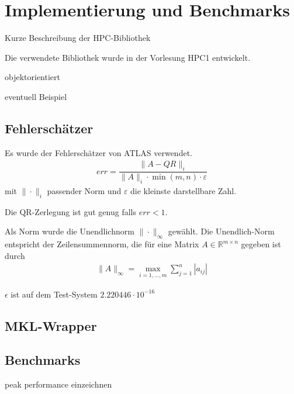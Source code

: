 \chapter{Implementierung und Benchmarks}
Kurze Beschreibung der HPC-Bibliothek

Die verwendete Bibliothek wurde in der Vorlesung HPC1 entwickelt.



objektorientiert%

eventuell Beispiel

\section{Fehlerschätzer}

Es wurde der Fehlerschätzer von ATLAS verwendet.
\begin{align}
	err = \dfrac{\|A - QR\|_i}{\|A\|_i \cdot \min(m,n) \cdot \varepsilon}
\end{align}
mit $\|\cdot\|_i$ passender Norm und $\varepsilon$ die kleinste darstellbare Zahl.

Die QR-Zerlegung ist gut genug falls $ err < 1 $.

Als Norm wurde die Unendlichnorm $\|\cdot\|_\infty$ gewählt.
Die Unendlich-Norm entspricht der Zeilensummennorm, die für eine Matrix $A \in \mathbb{R}^{m\times n}$ gegeben ist durch
\begin{align*}
	\|A\|_\infty = \max_{i=1,...,m} \sum_{j=1}^{n} |a_{ij}|
\end{align*}

$\epsilon$ ist auf dem Test-System $2.220446\cdot10^{-16}$

\section{MKL-Wrapper}

\section{Benchmarks}

peak performance einzeichnen